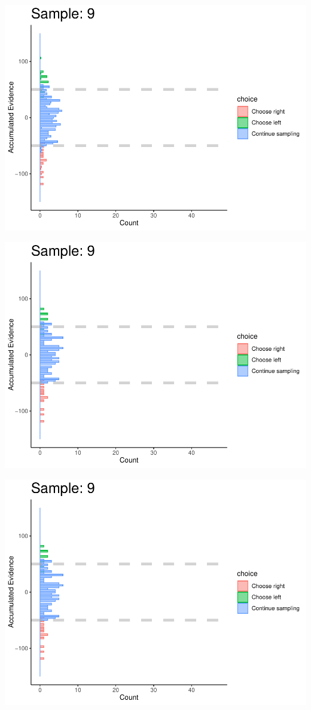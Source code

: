 \documentclass[
]{book}
\begin{document}
\begin{center}\includegraphics[width=0.8\linewidth]{LateNightBayes_files/figure-latex/fixed_check-79} \end{center}

\begin{center}\includegraphics[width=0.8\linewidth]{LateNightBayes_files/figure-latex/fixed_check-80} \end{center}

\begin{center}\includegraphics[width=0.8\linewidth]{LateNightBayes_files/figure-latex/fixed_check-81} \end{center}
\end{document}
